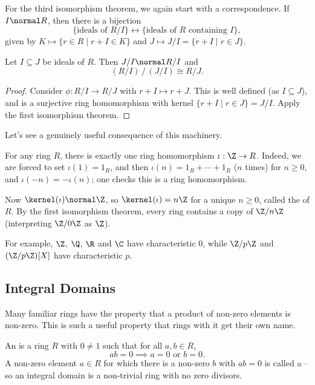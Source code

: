 For the third isomorphism theorem, we again start with a correspondence. If $I \normal R$, then there is a bijection
$$
\{\text{ideals of } R/I\} \longleftrightarrow \{\text{ideals of } R \text{ containing } I\},
$$
given by $K \mapsto \{r \in R \mid r + I \in K\}$ and $J \mapsto J/I = \{r + I \mid r \in J\}$.

\begin{theorem}
	Let $I \subseteq J$ be ideals of $R$. Then $J/I \normal R/I$ and
	$$
	(R/I)\,/\,(J/I) \cong R/J.
	$$
\end{theorem}
\begin{proof}
	Consider $\phi: R/I \rightarrow R/J$ with $r + I \mapsto r + J$. This is well defined (as $I \subseteq J$), and is a surjective ring homomorphism with kernel $\{r + I \mid r \in J\} = J/I$. Apply the first isomorphism theorem.
\end{proof}

Let's see a genuinely useful consequence of this machinery.

\begin{example}
	For any ring $R$, there is exactly one ring homomorphism $\iota : \Z \rightarrow R$. Indeed, we are forced to set $\iota(1) = 1_R$, and then $\iota(n) = 1_R + \cdots + 1_R$ ($n$ times) for $n \geq 0$, and $\iota(-n) = -\iota(n)$; one checks this is a ring homomorphism.

	Now $\kernel(\iota) \normal \Z$, so $\kernel(\iota) = n\Z$ for a unique $n \geq 0$, called the  of $R$. By the first isomorphism theorem, every ring contains a copy of $\Z/n\Z$ (interpreting $\Z/0\Z$ as $\Z$).

	For example, $\Z$, $\Q$, $\R$ and $\C$ have characteristic $0$, while $\Z/p\Z$ and $(\Z/p\Z)[X]$ have characteristic $p$.
\end{example}

\subsection{Integral Domains}

Many familiar rings have the property that a product of non-zero elements is non-zero. This is such a useful property that rings with it get their own name.

\begin{definition}
	An  is a ring $R$ with $0 \neq 1$ such that for all $a, b \in R$,
	$$
	ab = 0 \implies a = 0 \text{ or } b = 0.
	$$
	A non-zero element $a \in R$ for which there is a non-zero $b$ with $ab = 0$ is called a  -- so an integral domain is a non-trivial ring with no zero divisors.
\end{definition}

